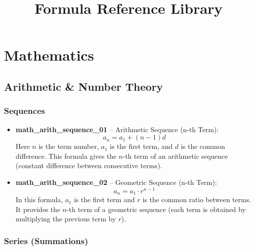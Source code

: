 \documentclass[11pt,a4paper]{article}
\begin{document}
\title{\textbf{Formula Reference Library}}
\author{}
\date{}
\maketitle

\section{Mathematics}

\subsection{Arithmetic \& Number Theory}

\subsubsection{Sequences}

\begin{itemize}
\item \textbf{math\_arith\_sequence\_01} -- Arithmetic Sequence (n-th Term): 
\[a_n = a_1 + (n-1)d\]
Here $n$ is the term number, $a_1$ is the first term, and $d$ is the common difference. This formula gives the $n$-th term of an arithmetic sequence (constant difference between consecutive terms).

\item \textbf{math\_arith\_sequence\_02} -- Geometric Sequence (n-th Term): 
\[a_n = a_1 \cdot r^{n-1}\]
In this formula, $a_1$ is the first term and $r$ is the common ratio between terms. It provides the $n$-th term of a geometric sequence (each term is obtained by multiplying the previous term by $r$).
\end{itemize}

\subsubsection{Series (Summations)}
\end{document}
